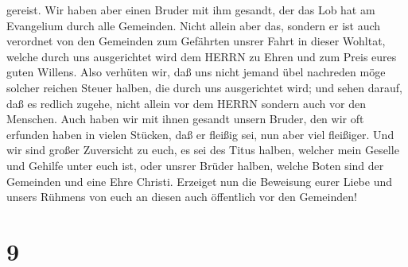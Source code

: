 gereist.  Wir haben aber einen Bruder mit ihm gesandt, der
das Lob hat am Evangelium durch alle Gemeinden.  Nicht
allein aber das, sondern er ist auch verordnet von den Gemeinden zum
Gefährten unsrer Fahrt in dieser Wohltat, welche durch uns ausgerichtet
wird dem HERRN zu Ehren und zum Preis eures guten Willens. 
Also verhüten wir, daß uns nicht jemand übel nachreden möge solcher
reichen Steuer halben, die durch uns ausgerichtet wird; 
und sehen darauf, daß es redlich zugehe, nicht allein vor dem HERRN
sondern auch vor den Menschen.  Auch haben wir mit ihnen
gesandt unsern Bruder, den wir oft erfunden haben in vielen Stücken, daß
er fleißig sei, nun aber viel fleißiger.  Und wir sind
großer Zuversicht zu euch, es sei des Titus halben, welcher mein Geselle
und Gehilfe unter euch ist, oder unsrer Brüder halben, welche Boten sind
der Gemeinden und eine Ehre Christi.  Erzeiget nun die
Beweisung eurer Liebe und unsers Rühmens von euch an diesen auch
öffentlich vor den Gemeinden!

\hypertarget{section-8}{%
\section{9}\label{section-8}}

